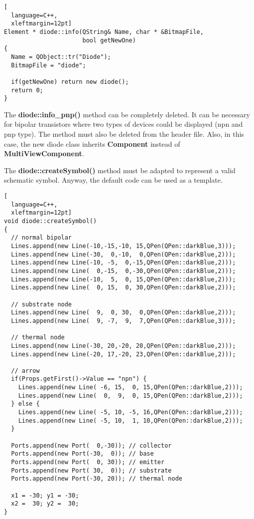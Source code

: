 \begin{lstlisting}[
  language=C++,
  xleftmargin=12pt]
Element * diode::info(QString& Name, char * &BitmapFile,
                      bool getNewOne)
{
  Name = QObject::tr("Diode");
  BitmapFile = "diode";

  if(getNewOne) return new diode();
  return 0;
}
\end{lstlisting}

The \textbf{diode::info\_pnp()} method can be completely deleted.  It
can be necessary for bipolar transistors where two types of devices
could be displayed (npn and pnp type).  The method must also be
deleted from the header file.  Also, in this case, the new diode class
inherits \textbf{Component} instead of \textbf{MultiViewComponent}.

\addvspace{12pt}

The \textbf{diode::createSymbol()} method must be adapted to represent
a valid schematic symbol.  Anyway, the default code can be used as a
template.
\begin{lstlisting}[
  language=C++,
  xleftmargin=12pt]
void diode::createSymbol()
{
  // normal bipolar
  Lines.append(new Line(-10,-15,-10, 15,QPen(QPen::darkBlue,3)));
  Lines.append(new Line(-30,  0,-10,  0,QPen(QPen::darkBlue,2)));
  Lines.append(new Line(-10, -5,  0,-15,QPen(QPen::darkBlue,2)));
  Lines.append(new Line(  0,-15,  0,-30,QPen(QPen::darkBlue,2)));
  Lines.append(new Line(-10,  5,  0, 15,QPen(QPen::darkBlue,2)));
  Lines.append(new Line(  0, 15,  0, 30,QPen(QPen::darkBlue,2)));

  // substrate node
  Lines.append(new Line(  9,  0, 30,  0,QPen(QPen::darkBlue,2)));
  Lines.append(new Line(  9, -7,  9,  7,QPen(QPen::darkBlue,3)));

  // thermal node
  Lines.append(new Line(-30, 20,-20, 20,QPen(QPen::darkBlue,2)));
  Lines.append(new Line(-20, 17,-20, 23,QPen(QPen::darkBlue,2)));  

  // arrow
  if(Props.getFirst()->Value == "npn") {
    Lines.append(new Line( -6, 15,  0, 15,QPen(QPen::darkBlue,2)));
    Lines.append(new Line(  0,  9,  0, 15,QPen(QPen::darkBlue,2)));
  } else {
    Lines.append(new Line( -5, 10, -5, 16,QPen(QPen::darkBlue,2)));
    Lines.append(new Line( -5, 10,  1, 10,QPen(QPen::darkBlue,2)));
  }

  Ports.append(new Port(  0,-30)); // collector
  Ports.append(new Port(-30,  0)); // base
  Ports.append(new Port(  0, 30)); // emitter
  Ports.append(new Port( 30,  0)); // substrate
  Ports.append(new Port(-30, 20)); // thermal node

  x1 = -30; y1 = -30;
  x2 =  30; y2 =  30;
}
\end{lstlisting}

